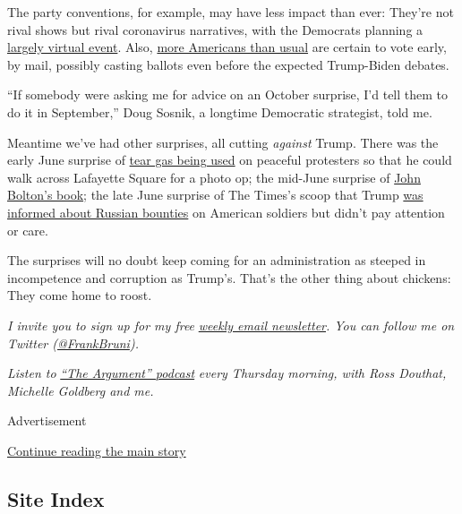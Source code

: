 The party conventions, for example, may have less impact than ever:
They're not rival shows but rival coronavirus narratives, with the
Democrats planning a
\href{https://www.wispolitics.com/2020/2020-dem-national-convention-moving-to-largely-virtual-format-smaller-venue/}{largely
virtual event}. Also,
\href{https://www.theatlantic.com/politics/archive/2020/04/voting-mail-2020-race-between-biden-and-trump/609799/}{more
Americans than usual} are certain to vote early, by mail, possibly
casting ballots even before the expected Trump-Biden debates.

``If somebody were asking me for advice on an October surprise, I'd tell
them to do it in September,'' Doug Sosnik, a longtime Democratic
strategist, told me.

Meantime we've had other surprises, all cutting \emph{against} Trump.
There was the early June surprise of
\href{https://www.nytimes3xbfgragh.onion/2020/06/01/us/politics/trump-st-johns-church-bible.html}{tear
gas being used} on peaceful protesters so that he could walk across
Lafayette Square for a photo op; the mid-June surprise of
\href{https://www.nytimes3xbfgragh.onion/2020/06/17/books/review-room-where-it-happened-john-bolton-memoir.html}{John
Bolton's book}; the late June surprise of The Times's scoop that Trump
\href{https://www.nytimes3xbfgragh.onion/2020/06/29/us/politics/russian-bounty-trump.html}{was
informed about Russian bounties} on American soldiers but didn't pay
attention or care.

The surprises will no doubt keep coming for an administration as steeped
in incompetence and corruption as Trump's. That's the other thing about
chickens: They come home to roost.

\emph{I invite you to sign up for my free}
\href{https://www.nytimes3xbfgragh.onion/newsletters/frank-bruni}{\emph{weekly
email newsletter}}\emph{. You can follow me on Twitter
(}\href{https://twitter.com/FrankBruni}{\emph{@FrankBruni}}\emph{).}

\emph{Listen to}
\href{https://www.nytimes3xbfgragh.onion/column/the-argument}{\emph{``The
Argument'' podcast}} \emph{every Thursday morning, with Ross Douthat,
Michelle Goldberg and me.}

Advertisement

\protect\hyperlink{after-bottom}{Continue reading the main story}

\hypertarget{site-index}{%
\subsection{Site Index}\label{site-index}}

